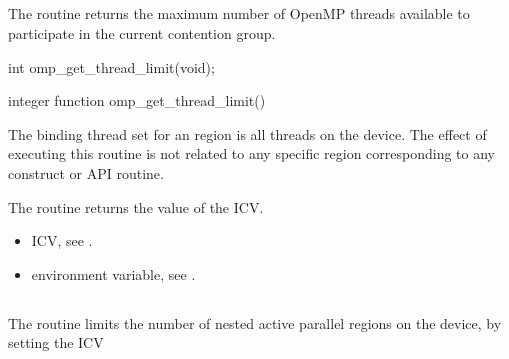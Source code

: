 \subsection{}
\label{subsec:omp_get_thread_limit}
\summary
The  routine returns the maximum number of OpenMP 
threads available to participate in the current contention group. 

\format
\begin{ccppspecific}
\begin{boxedcode}
int omp\_get\_thread\_limit(void);
\end{boxedcode}
\end{ccppspecific}

\begin{fortranspecific}
\begin{boxedcode}
integer function omp\_get\_thread\_limit()
\end{boxedcode}
\end{fortranspecific}

\binding
The binding thread set for an  region is all threads on the 
device. The effect of executing this routine is not related to any specific region 
corresponding to any construct or API routine. 

\effect
The  routine returns the value of the  ICV.

\crossreferences
\begin{itemize}
\item {} ICV, see 
.

\item {} environment variable, see 
.
\end{itemize}









\subsection{}
\label{subsec:omp_set_max_active_levels}
\summary
The  routine limits the number of nested active 
parallel regions on the device, by setting the  ICV

